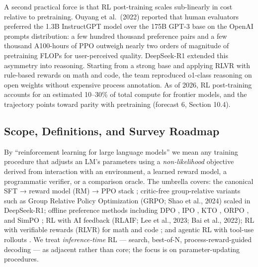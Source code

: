 \documentclass{article}
\begin{document}
A second practical force is that RL post-training scales sub-linearly in cost relative to pretraining. Ouyang et al.~(2022) reported that human evaluators preferred the 1.3B InstructGPT model over the 175B GPT-3 base on the OpenAI prompts distribution: a few hundred thousand preference pairs and a few thousand A100-hours of PPO outweigh nearly two orders of magnitude of pretraining FLOPs for user-perceived quality. DeepSeek-R1 extended this asymmetry into reasoning. Starting from a strong base and applying RLVR with rule-based rewards on math and code, the team reproduced o1-class reasoning on open weights without expensive process annotation. As of 2026, RL post-training accounts for an estimated 10--30\% of total compute for frontier models, and the trajectory points toward parity with pretraining (forecast 6, Section 10.4).

\subsection{Scope, Definitions, and Survey Roadmap}\label{scope-definitions-and-survey-roadmap}

By ``reinforcement learning for large language models'' we mean any training procedure that adjusts an LM's parameters using a \emph{non-likelihood} objective derived from interaction with an environment, a learned reward model, a programmatic verifier, or a comparison oracle. The umbrella covers: the canonical SFT → reward model (RM) → PPO stack \citep{ouyang20222022}; critic-free group-relative variants such as Group Relative Policy Optimization (GRPO; Shao et al., 2024) scaled in DeepSeek-R1; offline preference methods including DPO \citep{rafailov2023directpreferenceop}, IPO \citep{azar2023ageneraltheoretica}, KTO \citep{ethayarajh2024ktomodelalignmenta}, ORPO \citep{hong2024orpomonolithicpref}, and SimPO \citep{meng2024simposimpleprefere}; RL with AI feedback (RLAIF; Lee et al., 2023; Bai et al., 2022); RL with verifiable rewards (RLVR) for math and code \citep{guo20252025}; and agentic RL with tool-use rollouts \citep{cheng20252025}. We treat \emph{inference-time} RL --- search, best-of-N, process-reward-guided decoding --- as adjacent rather than core; the focus is on parameter-updating procedures.
\end{document}
